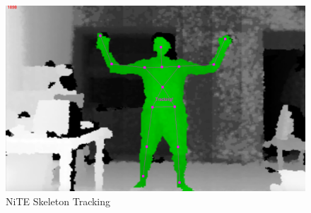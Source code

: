 \begin{figure}
	[h] \centering 
	\includegraphics[height=7cm]{figures/content/ni-skeleton.jpg} \caption{NiTE Skeleton Tracking} \label{fg:ni:skeleton} 
\end{figure}